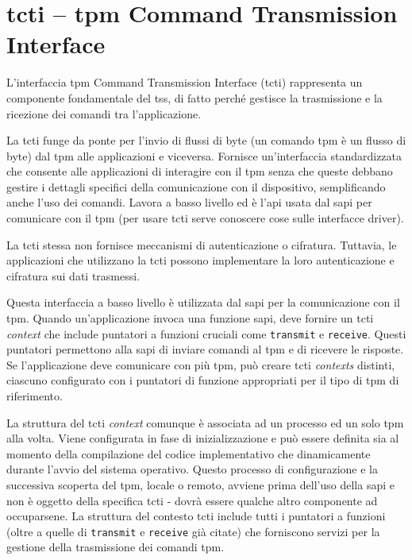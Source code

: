 \section{\acrshort{tcti} -- \acrshort{tpm} Command Transmission Interface}\label{sec:tcti}

L'interfaccia \acrshort{tpm} Command Transmission Interface (\acrshort{tcti}) rappresenta un componente fondamentale del \acrshort{tss}, di fatto perché gestisce la trasmissione e la ricezione dei comandi tra l'applicazione.

La \acrshort{tcti} funge da ponte per l'invio di flussi di byte (un comando \acrshort{tpm} è un flusso di byte) dal \acrshort{tpm} alle applicazioni e viceversa. Fornisce un'interfaccia standardizzata che consente alle applicazioni di interagire con il \acrshort{tpm} senza che queste debbano gestire i dettagli specifici della comunicazione con il dispositivo, semplificando anche l'uso dei comandi. Lavora a basso livello ed è l'\acrshort{api} usata dal \acrshort{sapi} per comunicare con il \acrshort{tpm} (per usare \acrshort{tcti} serve conoscere cose sulle interfacce driver).

La \acrshort{tcti} stessa non fornisce meccanismi di autenticazione o cifratura. Tuttavia, le applicazioni che utilizzano la \acrshort{tcti} possono implementare la loro autenticazione e cifratura sui dati trasmessi.

Questa interfaccia a basso livello è utilizzata dal \acrshort{sapi} per la comunicazione con il \acrshort{tpm}. Quando un'applicazione invoca una funzione \acrshort{sapi}, deve fornire un \acrshort{tcti} \textit{context} che include puntatori a funzioni cruciali come \texttt{transmit} e \texttt{receive}. Questi puntatori permettono alla \acrshort{sapi} di inviare comandi al \acrshort{tpm} e di ricevere le risposte. Se l'applicazione deve comunicare con più \acrshort{tpm}, può creare \acrshort{tcti} \textit{contexts} distinti, ciascuno configurato con i puntatori di funzione appropriati per il tipo di \acrshort{tpm} di riferimento.

La struttura del \acrshort{tcti} \textit{context} comunque è associata ad un processo ed un solo \acrshort{tpm} alla volta. Viene configurata in fase di inizializzazione e può essere definita sia al momento della compilazione del codice implementativo che dinamicamente durante l'avvio del sistema operativo. Questo processo di configurazione e la successiva scoperta del \acrshort{tpm}, locale o remoto, avviene prima dell'uso della \acrshort{sapi} e non è oggetto della specifica \acrshort{tcti} - dovrà essere qualche altro componente ad occuparsene. La struttura del contesto \acrshort{tcti} include tutti i puntatori a funzioni (oltre a quelle di \texttt{transmit} e \texttt{receive} già citate) che forniscono servizi per la gestione della trasmissione dei comandi \acrshort{tpm}.

